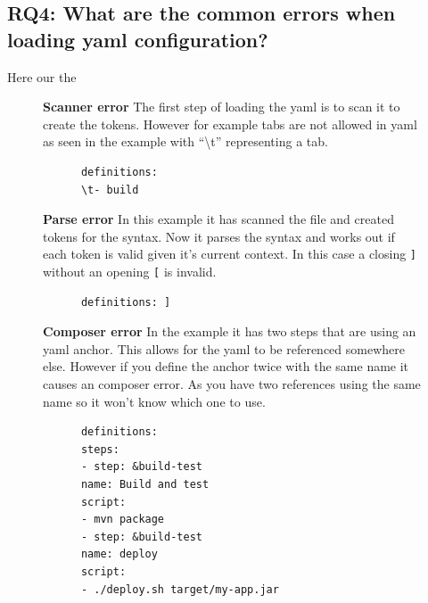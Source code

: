 \documentclass[twoside,12pt,titlepage,a4paper]{article}
\begin{document}
\subsection{\textbf{RQ4}: What are the common errors when loading yaml configuration?}
\label{section:RQ4}
\vspace*{-0.05in}
Here our the 
\begin{figure}[!h]
  \centering
  \begin{minipage}[t]{.48\textwidth}
    \textbf{Scanner error}
    The first step of loading the yaml is to scan it to create the tokens. However for example tabs are not allowed in yaml \citet{YAML_FAQ_TABS} as seen in the example with \enquote{\textbackslash t} representing a tab. 
  \end{minipage}%
  \hfill
  \begin{minipage}[t]{.48\textwidth}
    \begin{verbatim}
      definitions: 
      \t- build
    \end{verbatim}
  \end{minipage}
\end{figure}
\begin{figure}[!ht]
  \centering
  \begin{minipage}[t]{.48\textwidth}
    \textbf{Parse error}
    In this example it has scanned the file and created tokens for the syntax. Now it parses the syntax and works out if each token is valid given it's current context. In this case a closing \verb|]| without an opening \verb|[| is invalid.
  \end{minipage}%
  \hfill
  \begin{minipage}[t]{.48\textwidth}
    \begin{verbatim}
      definitions: ]
    \end{verbatim}
  \end{minipage}
\end{figure}

\begin{figure}[!ht]
  \centering
  \begin{minipage}[t]{.48\textwidth}
    \textbf{Composer error}
    In the example it has two steps that are using an yaml anchor. This allows for the yaml to be referenced somewhere else. However if you define the anchor twice with the same name it causes an composer error. As you have two references using the same name so it won't know which one to use.
  \end{minipage}%
  \hfill
  \begin{minipage}[t]{.48\textwidth}
    \begin{verbatim}
      definitions: 
      steps:
      - step: &build-test
      name: Build and test
      script:
      - mvn package
      - step: &build-test
      name: deploy
      script:
      - ./deploy.sh target/my-app.jar
    \end{verbatim}
  \end{minipage}
\end{figure}
\end{document}
